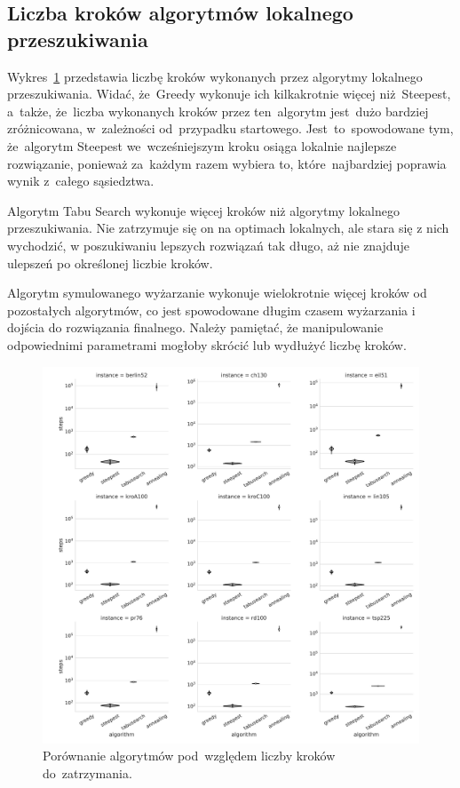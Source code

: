 \subsection{Liczba kroków algorytmów lokalnego przeszukiwania}

Wykres~\ref{fig:steps} przedstawia liczbę kroków wykonanych przez algorytmy lokalnego przeszukiwania. Widać, że~Greedy wykonuje ich kilkakrotnie więcej niż~Steepest, a~także, że~liczba wykonanych kroków przez ten~algorytm jest~dużo bardziej zróżnicowana, w~zależności od~przypadku startowego. Jest~to~spowodowane tym, że~algorytm Steepest we~wcześniejszym kroku osiąga lokalnie najlepsze rozwiązanie, ponieważ za~każdym razem wybiera to, które~najbardziej poprawia wynik z~całego sąsiedztwa.

{\color{part2}
Algorytm Tabu Search wykonuje więcej kroków niż algorytmy lokalnego przeszukiwania. Nie zatrzymuje się on na optimach lokalnych, ale stara się z nich wychodzić, w poszukiwaniu lepszych rozwiązań tak długo, aż nie znajduje ulepszeń po określonej liczbie kroków.

Algorytm symulowanego wyżarzanie wykonuje wielokrotnie więcej kroków od pozostałych algorytmów, co jest spowodowane długim czasem wyżarzania i dojścia do rozwiązania finalnego. Należy pamiętać, że manipulowanie odpowiednimi parametrami mogłoby skrócić lub wydłużyć liczbę kroków.
}

\begin{figure}[H]
\begin{center}
\includegraphics[width=1.0\textwidth]{graphs/steps_comparison_violin.pdf}
\end{center}
\caption{Porównanie algorytmów pod~względem liczby kroków do~zatrzymania.}
\label{fig:steps}
\end{figure}

